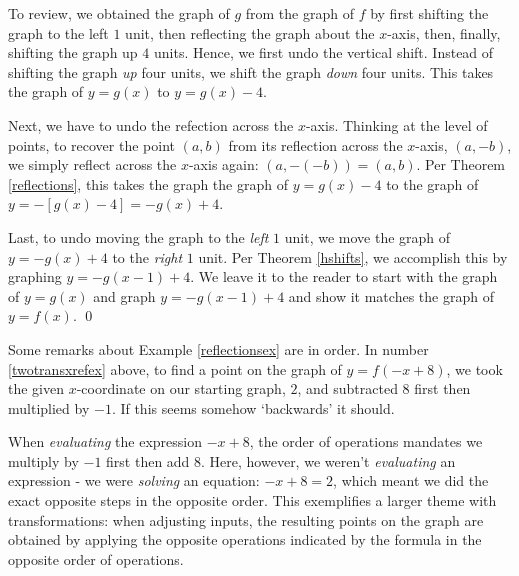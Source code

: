 \begin{ex}
\begin{enumerate}
 To review, we obtained the graph of $g$ from the graph of $f$ by first shifting the graph to the left $1$ unit, then reflecting the graph about the $x$-axis, then, finally, shifting the graph up $4$ units.  Hence, we first undo the vertical shift.  Instead of shifting the graph \textit{up} four units, we shift the graph \textit{down} four units.  This takes the graph of $y = g(x)$ to $y = g(x)-4$.  
 
 Next, we have to undo the refection across the $x$-axis.  Thinking at the level of points, to recover the point $(a,b)$ from its reflection across the $x$-axis, $(a,-b)$, we simply reflect across the $x$-axis again: $(a,-(-b)) = (a,b)$.  Per Theorem \ref{reflections}, this takes the graph the graph of $y = g(x)-4$ to the graph of $y = -[g(x)-4] = -g(x) + 4$. 
 
 Last, to undo moving the graph to the \textit{left} $1$ unit, we move the graph of $y=-g(x)+4$ to the \textit{right} $1$ unit.  Per Theorem \ref{hshifts}, we accomplish this by graphing $y = -g(x-1)+4$.  We leave it to the reader to start with the graph of $y=g(x)$ and graph $y = -g(x-1)+4$ and show it matches the graph of $y=f(x)$. \qed
    
\end{enumerate}

\end{ex}

Some remarks about Example \ref{reflectionsex}  are in order. In number \ref{twotransxrefex} above, to find a point on the graph of $y=f(-x+8)$, we took the given $x$-coordinate on our starting graph, $2$, and subtracted $8$ first then multiplied by $-1$.  If this seems somehow `backwards' it should.  

When \textit{evaluating} the expression $-x+8$, the order of operations mandates we multiply by $-1$ first then add $8$.  Here, however, we weren't \textit{evaluating} an expression - we were \textit{solving} an equation:  $-x+8 = 2$, which meant we did the exact opposite steps in the opposite order.  This exemplifies a larger theme with transformations:  when adjusting inputs, the resulting points on the graph are obtained by applying the opposite operations indicated by the formula in the opposite order of operations.

